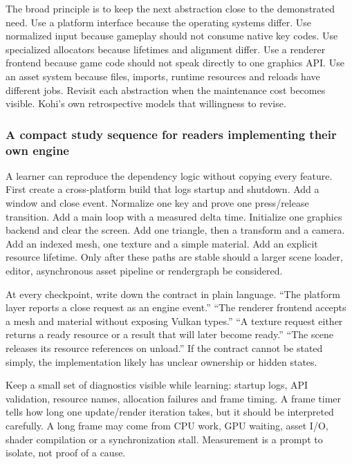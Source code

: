 The broad principle is to keep the next abstraction close to the demonstrated need. Use a platform interface because the operating systems differ. Use normalized input because gameplay should not consume native key codes. Use specialized allocators because lifetimes and alignment differ. Use a renderer frontend because game code should not speak directly to one graphics API. Use an asset system because files, imports, runtime resources and reloads have different jobs. Revisit each abstraction when the maintenance cost becomes visible. Kohi's own retrospective models that willingness to revise.

\subsubsection{A compact study sequence for readers implementing their own engine}\label{06-engine-ii-ch042-a-compact-study-sequence-for-readers-implementing-their-own-engine}

\hypertarget{06-engine-ii-ch042-a-compact-study-sequence-for-readers-implementing-their-own-engine}{}

A learner can reproduce the dependency logic without copying every feature. First create a cross-platform build that logs startup and shutdown. Add a window and close event. Normalize one key and prove one press/release transition. Add a main loop with a measured delta time. Initialize one graphics backend and clear the screen. Add one triangle, then a transform and a camera. Add an indexed mesh, one texture and a simple material. Add an explicit resource lifetime. Only after these paths are stable should a larger scene loader, editor, asynchronous asset pipeline or rendergraph be considered.

At every checkpoint, write down the contract in plain language. ``The platform layer reports a close request as an engine event.'' ``The renderer frontend accepts a mesh and material without exposing Vulkan types.'' ``A texture request either returns a ready resource or a result that will later become ready.'' ``The scene releases its resource references on unload.'' If the contract cannot be stated simply, the implementation likely has unclear ownership or hidden states.

Keep a small set of diagnostics visible while learning: startup logs, API validation, resource names, allocation failures and frame timing. A frame timer tells how long one update/render iteration takes, but it should be interpreted carefully. A long frame may come from CPU work, GPU waiting, asset I/O, shader compilation or a synchronization stall. Measurement is a prompt to isolate, not proof of a cause.

